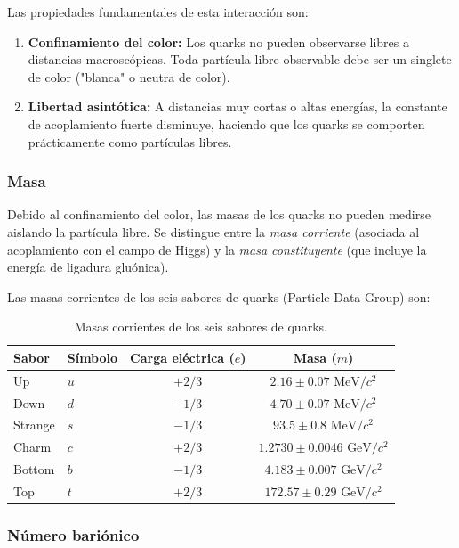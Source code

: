 Las propiedades fundamentales de esta interacción son:
\begin{enumerate}
    \item \textbf{Confinamiento del color:} Los quarks no pueden observarse libres a distancias macroscópicas. Toda partícula libre observable debe ser un singlete de color ("blanca" o neutra de color).
    \item \textbf{Libertad asintótica:} A distancias muy cortas o altas energías, la constante de acoplamiento fuerte disminuye, haciendo que los quarks se comporten prácticamente como partículas libres.
\end{enumerate}

\subsubsection{Masa}

Debido al confinamiento del color, las masas de los quarks no pueden medirse aislando la partícula libre. Se distingue entre la \textit{masa corriente} (asociada al acoplamiento con el campo de Higgs) y la \textit{masa constituyente} (que incluye la energía de ligadura gluónica).

Las masas corrientes de los seis sabores de quarks (Particle Data Group) son:
\begin{table}[htbp]
    \centering
    \caption{Masas corrientes de los seis sabores de quarks.}
    \label{tab:masas_quarks}
    \begin{tabular}{llcc}
        \toprule
        \textbf{Sabor} & \textbf{Símbolo} & \textbf{Carga eléctrica ($e$)} & \textbf{Masa ($m$)} \\
        \midrule
        Up & $u$ & $+2/3$ & $2.16 \pm 0.07 \text{ MeV}/c^2$ \\
        Down & $d$ & $-1/3$ & $4.70 \pm 0.07 \text{ MeV}/c^2$ \\
        Strange & $s$ & $-1/3$ & $93.5 \pm 0.8 \text{ MeV}/c^2$ \\
        Charm & $c$ & $+2/3$ & $1.2730 \pm 0.0046 \text{ GeV}/c^2$ \\
        Bottom & $b$ & $-1/3$ & $4.183 \pm 0.007 \text{ GeV}/c^2$ \\
        Top & $t$ & $+2/3$ & $172.57 \pm 0.29 \text{ GeV}/c^2$ \\
        \bottomrule
    \end{tabular}
\end{table}

\subsubsection{Número bariónico}

